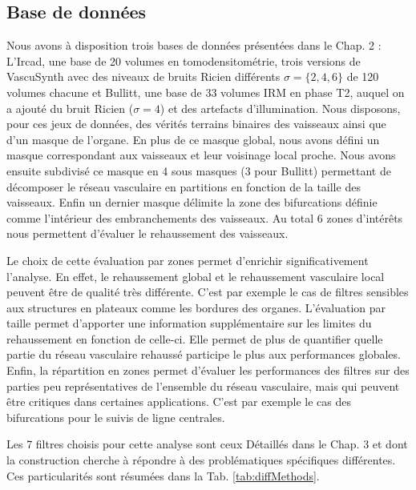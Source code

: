 \subsection{Base de données}
Nous avons à disposition trois bases de données présentées dans le Chap. 2 : L'Ircad, une base de 20 volumes en tomodensitométrie, trois versions de VascuSynth avec des niveaux de bruits Ricien différents $\sigma=\{2,4,6\}$ de 120 volumes chacune et Bullitt, une base de 33 volumes IRM en phase T2, auquel on a ajouté du bruit Ricien ($\sigma=4$) et des artefacts d'illumination. Nous disposons, pour ces jeux de données, des vérités terrains binaires des vaisseaux ainsi que d'un masque de l'organe. En plus de ce masque global, nous avons défini un masque correspondant aux vaisseaux et leur voisinage local proche. Nous avons ensuite subdivisé ce masque en 4 sous masques (3 pour Bullitt) permettant de décomposer le réseau vasculaire en partitions en fonction de la taille des vaisseaux. Enfin un dernier masque délimite la zone des bifurcations définie comme l'intérieur des embranchements des vaisseaux. Au total 6 zones d'intérêts nous permettent d'évaluer le rehaussement des vaisseaux. 

Le choix de cette évaluation par zones permet d'enrichir significativement l'analyse. En effet, le rehaussement global et le rehaussement vasculaire local peuvent être de qualité très différente. C'est par exemple le cas de filtres sensibles aux structures en plateaux comme les bordures des organes. L'évaluation par taille permet d'apporter une information supplémentaire sur les limites du rehaussement en fonction de celle-ci. Elle permet de plus de quantifier quelle partie du réseau vasculaire rehaussé participe le plus aux performances globales. Enfin, la répartition en zones permet d'évaluer les performances des filtres sur des parties peu représentatives de l'ensemble du réseau vasculaire, mais qui peuvent être critiques dans certaines applications. C'est par exemple le cas des bifurcations pour le suivis de ligne centrales.

Les 7 filtres choisis pour cette analyse sont ceux Détaillés dans le Chap. 3 et dont la construction cherche à répondre à des problématiques spécifiques différentes. Ces particularités sont résumées dans la Tab. \ref{tab:diffMethods}. 


